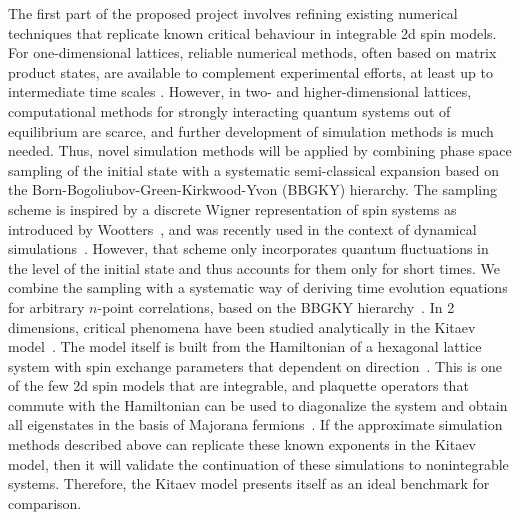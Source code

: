 \documentclass[a4paper,11pt,color]{article}
\begin{document}
The first part of the proposed project involves refining existing numerical techniques that replicate known critical behaviour in integrable 2d spin models.  For one-dimensional lattices, reliable numerical methods, often based on matrix product states, are available to complement experimental efforts, at least up to intermediate time scales \cite{Schollwoeck11}. However, in two- and higher-dimensional lattices, computational methods for strongly interacting quantum systems out of equilibrium are scarce, and further development of simulation methods is much needed. Thus, novel simulation methods will be applied by combining phase space sampling of the initial state with a systematic semi-classical expansion based on the Born-Bogoliubov-Green-Kirkwood-Yvon (BBGKY) hierarchy. The sampling scheme is inspired by a discrete Wigner representation of spin systems as introduced by Wootters~\cite{wootters}, and was recently used in the context of dynamical simulations~\cite{schachenmayer}. However, that scheme only incorporates quantum fluctuations in the level of the initial state and thus accounts for them only for short times. We combine the sampling with a systematic way of deriving time evolution equations for arbitrary $n$-point correlations, based on the BBGKY hierarchy~\cite{bbgky}.  In 2 dimensions, critical phenomena have been studied analytically in the Kitaev model~\cite{kitaev}. The model itself is built from the Hamiltonian of a hexagonal lattice system with spin exchange parameters that dependent on direction~\cite{kitaev-seminal}. This is one of the few 2d spin models that are integrable, and plaquette operators that commute with the Hamiltonian can be used to diagonalize the system and obtain all eigenstates in the basis of Majorana fermions~\cite{kitaev-seminal}. If the approximate simulation methods described above can replicate these known exponents in the Kitaev model, then it will validate the continuation of these simulations to nonintegrable systems. Therefore, the Kitaev model presents itself as  an ideal benchmark for comparison. 
\end{document}
